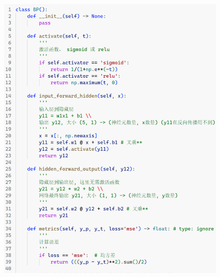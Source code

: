 \documentclass[a5paper, 11pt]{ctexbook}
\begin{document}
\begin{figure}[h!]
    \centering
    \includegraphics[width=\textwidth, frame]{figures/BP1.png}
\end{figure}

\newpage
\end{document}
